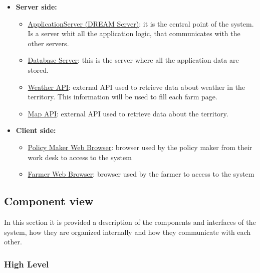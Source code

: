 \begin{itemize}
    \item \textbf{Server side:}
        \begin{itemize}
            \item \underline{ApplicationServer (DREAM Server)}: it is the central point of the system. Is a server whit all the application logic, that communicates with the other servers. 
            \item \underline{Database Server}: this is the server where all the application data are stored.
            \item \underline{Weather API}: external API used to retrieve data about weather in the territory. This information will be used to fill each farm page.
            \item \underline{Map API}: external API used to retrieve data about the territory.
        \end{itemize}
    \item \textbf{Client side:}
        \begin{itemize}
            \item \underline{Policy Maker Web Browser}: browser used by the policy maker from their work desk to access to the system
            \item \underline{Farmer Web Browser}: browser used by the farmer to access to the system
        \end{itemize}
\end{itemize}


\subsection{Component view}

In this section it is provided a description of the components and interfaces of the system, how they are organized internally and how they communicate with each other.

\subsubsection{High Level}

